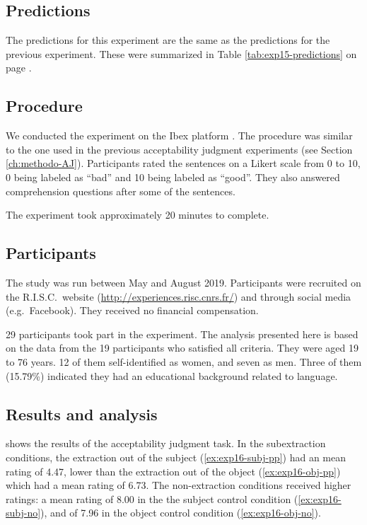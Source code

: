 \subsection{Predictions}

The predictions for this experiment are the same as the predictions for the previous experiment. These were summarized in Table \ref{tab:exp15-predictions} on page \pageref{tab:exp15-predictions}.

\subsection{Procedure} 

We conducted the experiment on the Ibex platform \citep{Ibex}. The procedure was similar to the one used in the previous acceptability judgment experiments (see Section \ref{ch:methodo-AJ}). Participants rated the sentences on a Likert scale from 0 to 10, 0 being labeled as ``bad'' and 10 being labeled as ``good''. They also answered comprehension questions after some of the sentences.

The experiment took approximately 20 minutes to complete. 

\subsection{Participants}

The study was run between May and August 2019. 
Participants were recruited on the R.I.S.C.\ website (\url{http://experiences.risc.cnrs.fr/}) and through social media (e.g.\ Facebook).
They received no financial compensation. 

29 participants took part in the experiment. 
The analysis presented here is based on the data from the 19 participants who satisfied all criteria.
They were aged 19 to 76 years. 12 of them self-identified as women, and seven as men. Three of them (15.79\%) indicated they had an educational background related to language.

\subsection{Results and analysis}


 shows the results of the acceptability judgment task.
In the subextraction conditions, the extraction out of the subject (\ref{ex:exp16-subj-pp}) had an mean  rating of 4.47, lower than the extraction out of the object (\ref{ex:exp16-obj-pp}) which had a mean rating of 6.73. The non-extraction conditions received higher ratings: a mean rating of 8.00 in the the subject control condition (\ref{ex:exp16-subj-no}), and of 7.96 in the object control condition (\ref{ex:exp16-obj-no}). 

